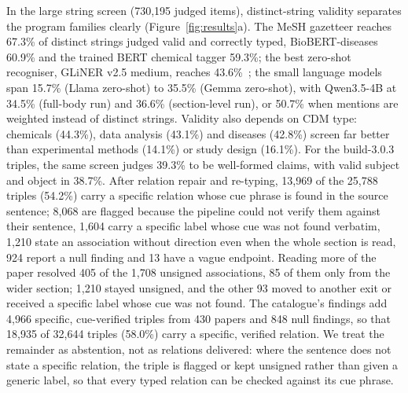 \documentclass[referee,lineno,pdflatex,sn-vancouver-num]{sn-jnl}
\theoremstyle{thmstyleone}%
\theoremstyle{thmstyletwo}%
\theoremstyle{thmstylethree}%
\begin{document}
In the large string screen (730{,}195 judged items), distinct-string
validity separates the program families clearly
(Figure~\ref{fig:results}a). The MeSH gazetteer reaches 67.3\% of distinct strings
judged valid and correctly typed, BioBERT-diseases~\cite{lee2019biobert} 60.9\% and the
trained BERT chemical tagger 59.3\%; the best zero-shot recogniser,
GLiNER v2.5 medium, reaches 43.6\%~\cite{zaratiana2024gliner,zaratiana2025gliner2}; the
small language models span 15.7\% (Llama zero-shot) to 35.5\% (Gemma
zero-shot), with Qwen3.5-4B at 34.5\% (full-body run) and 36.6\% (section-level
run), or 50.7\% when mentions are weighted instead of distinct
strings. Validity also depends on CDM type: chemicals (44.3\%), data
analysis (43.1\%) and diseases (42.8\%) screen far better than
experimental methods (14.1\%) or study design (16.1\%). For the
build-3.0.3 triples, the same screen judges 39.3\% to be well-formed
claims, with valid subject and object in 38.7\%. After relation repair and
re-typing, 13,969 of the 25,788 triples (54.2\%) carry a specific
relation whose cue phrase is found in the source sentence; 8,068 are
flagged because the pipeline could not verify them against their sentence,
1,604 carry a specific label
whose cue was not found verbatim, 1,210 state an association without
direction even when the whole section is read, 924 report a null finding
and 13 have a vague endpoint. Reading more of the paper resolved 405 of
the 1,708 unsigned associations, 85 of them only from the wider section; 1,210
stayed unsigned, and the other 93 moved to another exit or received a specific
label whose cue was not found.
The catalogue's findings add 4,966 specific, cue-verified triples from 430
papers and 848 null findings, so that 18,935 of 32,644 triples (58.0\%)
carry a specific, verified relation. We treat the remainder as abstention,
not as relations delivered: where the sentence does not state a specific
relation, the triple is flagged or kept unsigned rather than given a generic
label, so that every typed relation can be checked against its cue phrase.
\end{document}

